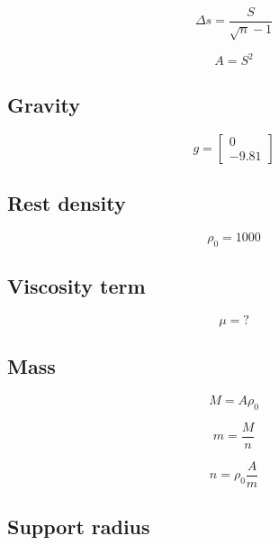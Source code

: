 \documentclass[11pt,norsk,a4paper]{article}
\begin{document}
\begin{equation}
    \Delta s = \frac{S}{\sqrt{n} - 1}
\end{equation}

\begin{equation}
    A = S^2
\end{equation}

\subsection{Gravity}

\begin{equation}
    g = \begin{bmatrix} 0 \\ -9.81 \end{bmatrix}
\end{equation}

\subsection{Rest density}

\begin{equation}
    \rho_0 = 1000
\end{equation}

\subsection{Viscosity term}

\begin{equation}
    \mu = ?
\end{equation}

\subsection{Mass}

\begin{equation}
    M = A \rho_0
\end{equation}

\begin{equation}
    m = \frac{M}{n}
\end{equation}

\begin{equation}
    n = \rho_0 \frac{A}{m}
\end{equation}

\subsection{Support radius}
\end{document}
